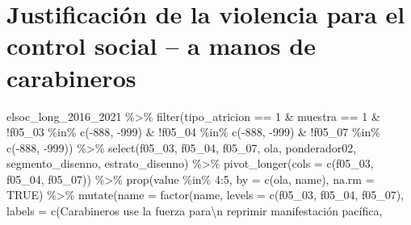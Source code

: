\documentclass[
  12pt,
]{book}
\newenvironment{Shaded}{\begin{snugshade}}{\end{snugshade}}
\newcommand{\AttributeTok}[1]{\textcolor[rgb]{0.77,0.63,0.00}{#1}}
\newcommand{\ConstantTok}[1]{\textcolor[rgb]{0.00,0.00,0.00}{#1}}
\newcommand{\DecValTok}[1]{\textcolor[rgb]{0.00,0.00,0.81}{#1}}
\newcommand{\FunctionTok}[1]{\textcolor[rgb]{0.00,0.00,0.00}{#1}}
\newcommand{\NormalTok}[1]{#1}
\newcommand{\SpecialCharTok}[1]{\textcolor[rgb]{0.00,0.00,0.00}{#1}}
\newcommand{\StringTok}[1]{\textcolor[rgb]{0.31,0.60,0.02}{#1}}
\begin{document}
\hypertarget{justificaciuxf3n-de-la-violencia-para-el-control-social-a-manos-de-carabineros}{%
\section{Justificación de la violencia para el control social -- a manos de carabineros}\label{justificaciuxf3n-de-la-violencia-para-el-control-social-a-manos-de-carabineros}}

\begin{Shaded}
\begin{Highlighting}[]
\NormalTok{elsoc\_long\_2016\_2021 }\SpecialCharTok{\%\textgreater{}\%} 
  \FunctionTok{filter}\NormalTok{(tipo\_atricion }\SpecialCharTok{==} \DecValTok{1} \SpecialCharTok{\&}\NormalTok{ muestra }\SpecialCharTok{==} \DecValTok{1} \SpecialCharTok{\&} 
           \SpecialCharTok{!}\NormalTok{f05\_03 }\SpecialCharTok{\%in\%} \FunctionTok{c}\NormalTok{(}\SpecialCharTok{{-}}\DecValTok{888}\NormalTok{, }\SpecialCharTok{{-}}\DecValTok{999}\NormalTok{) }\SpecialCharTok{\&} \SpecialCharTok{!}\NormalTok{f05\_04 }\SpecialCharTok{\%in\%} \FunctionTok{c}\NormalTok{(}\SpecialCharTok{{-}}\DecValTok{888}\NormalTok{, }\SpecialCharTok{{-}}\DecValTok{999}\NormalTok{) }\SpecialCharTok{\&} \SpecialCharTok{!}\NormalTok{f05\_07 }\SpecialCharTok{\%in\%} \FunctionTok{c}\NormalTok{(}\SpecialCharTok{{-}}\DecValTok{888}\NormalTok{, }\SpecialCharTok{{-}}\DecValTok{999}\NormalTok{)) }\SpecialCharTok{\%\textgreater{}\%}  
  \FunctionTok{select}\NormalTok{(f05\_03, f05\_04, f05\_07, ola, ponderador02, segmento\_disenno, estrato\_disenno) }\SpecialCharTok{\%\textgreater{}\%} 
  \FunctionTok{pivot\_longer}\NormalTok{(}\AttributeTok{cols =} \FunctionTok{c}\NormalTok{(f05\_03, f05\_04, f05\_07)) }\SpecialCharTok{\%\textgreater{}\%} 
  \FunctionTok{prop}\NormalTok{(value }\SpecialCharTok{\%in\%} \DecValTok{4}\SpecialCharTok{:}\DecValTok{5}\NormalTok{, }\AttributeTok{by =} \FunctionTok{c}\NormalTok{(ola, name), }\AttributeTok{na.rm =} \ConstantTok{TRUE}\NormalTok{) }\SpecialCharTok{\%\textgreater{}\%} 
  \FunctionTok{mutate}\NormalTok{(}\AttributeTok{name =} \FunctionTok{factor}\NormalTok{(name,}
                       \AttributeTok{levels =} \FunctionTok{c}\NormalTok{(}\StringTok{\textquotesingle{}f05\_03\textquotesingle{}}\NormalTok{, }\StringTok{\textquotesingle{}f05\_04\textquotesingle{}}\NormalTok{, }\StringTok{\textquotesingle{}f05\_07\textquotesingle{}}\NormalTok{),}
                       \AttributeTok{labels =} \FunctionTok{c}\NormalTok{(}\StringTok{\textquotesingle{}Carabineros use la fuerza para}\SpecialCharTok{\textbackslash{}n}\StringTok{ reprimir manifestación pacífica\textquotesingle{}}\NormalTok{,}

\end{Highlighting}
\end{Shaded}
\end{document}
